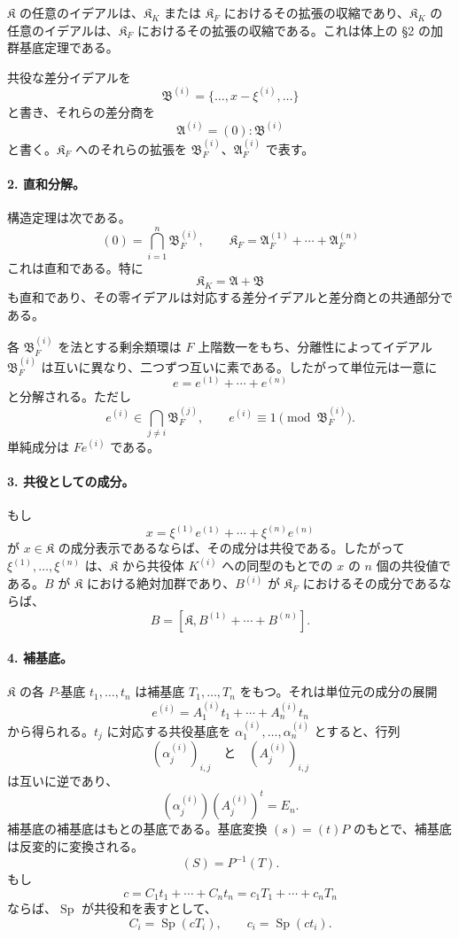 \(\mathfrak K\) の任意のイデアルは、\(\mathfrak K_K\) または \(\mathfrak K_F\) におけるその拡張の収縮であり、\(\mathfrak K_K\) の任意のイデアルは、\(\mathfrak K_F\) におけるその拡張の収縮である。これは体上の §2 の加群基底定理である。

共役な差分イデアルを
\[
        \mathfrak B^{(i)}=\{\ldots,x-\xi^{(i)},\ldots\}
\]
と書き、それらの差分商を
\[
        \mathfrak A^{(i)}=(0):\mathfrak B^{(i)}
\]
と書く。\(\mathfrak K_F\) へのそれらの拡張を \(\mathfrak B_F^{(i)}\)、\(\mathfrak A_F^{(i)}\) で表す。

\paragraph{2. 直和分解。}
構造定理は次である。
\[
        (0)=\bigcap_{i=1}^n \mathfrak B_F^{(i)},
        \qquad
        \mathfrak K_F=\mathfrak A_F^{(1)}+
        \cdots+\mathfrak A_F^{(n)}
\]
これは直和である。特に
\[
        \mathfrak K_K=\mathfrak A+\mathfrak B
\]
も直和であり、その零イデアルは対応する差分イデアルと差分商との共通部分である。

各 \(\mathfrak B_F^{(i)}\) を法とする剰余類環は \(F\) 上階数一をもち、分離性によってイデアル \(\mathfrak B_F^{(i)}\) は互いに異なり、二つずつ互いに素である。したがって単位元は一意に
\[
        e=e^{(1)}+
        \cdots+e^{(n)}
\]
と分解される。ただし
\[
        e^{(i)}\in\bigcap_{j\ne i}\mathfrak B_F^{(j)},
        \qquad
        e^{(i)}\equiv1\pmod {\mathfrak B_F^{(i)}}.
\]
単純成分は \(Fe^{(i)}\) である。

\paragraph{3. 共役としての成分。}
もし
\[
        x=\xi^{(1)}e^{(1)}+
        \cdots+\xi^{(n)}e^{(n)}
\]
が \(x\in\mathfrak K\) の成分表示であるならば、その成分は共役である。したがって \(\xi^{(1)},\ldots,\xi^{(n)}\) は、\(\mathfrak K\) から共役体 \(K^{(i)}\) への同型のもとでの \(x\) の \(n\) 個の共役値である。\(B\) が \(\mathfrak K\) における絶対加群であり、\(B^{(i)}\) が \(\mathfrak K_F\) におけるその成分であるならば、
\[
        B=[\mathfrak K,B^{(1)}+\cdots+B^{(n)}].
\]

\paragraph{4. 補基底。}
\(\mathfrak K\) の各 \(P\)-基底 \(t_1,\ldots,t_n\) は補基底 \(T_1,\ldots,T_n\) をもつ。それは単位元の成分の展開
\[
        e^{(i)}=A_1^{(i)}t_1+
        \cdots+A_n^{(i)}t_n
\]
から得られる。\(t_j\) に対応する共役基底を \(\alpha_1^{(i)},\ldots,\alpha_n^{(i)}\) とすると、行列
\[
        (\alpha_j^{(i)})_{i,j}
        \quad\text{と}\quad
        (A_j^{(i)})_{i,j}
\]
は互いに逆であり、
\[
        (\alpha_j^{(i)})(A_j^{(i)})^{t}=E_n.
\]
補基底の補基底はもとの基底である。基底変換 \((s)=(t)P\) のもとで、補基底は反変的に変換される。
\[
        (S)=P^{-1}(T).
\]
もし
\[
        c=C_1t_1+
        \cdots+C_nt_n
        =c_1T_1+
        \cdots+c_nT_n
\]
ならば、\(\operatorname{Sp}\) が共役和を表すとして、
\[
        C_i=\operatorname{Sp}(cT_i),
        \qquad
        c_i=\operatorname{Sp}(ct_i).
\]

